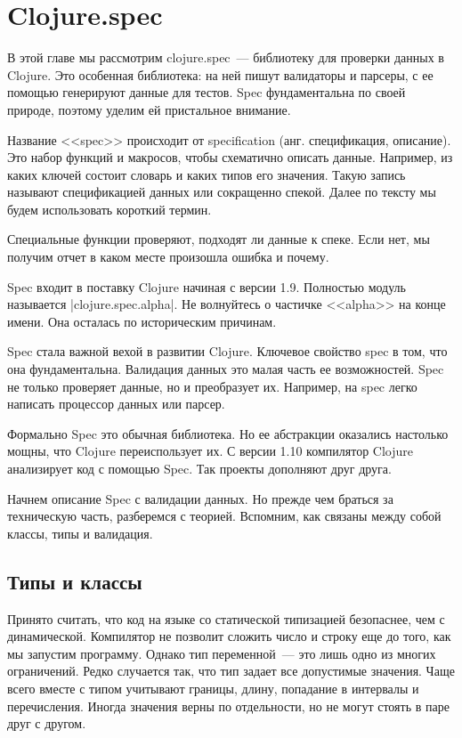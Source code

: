 \chapter{Clojure.spec}

\begin{teaser}
В этой главе мы рассмотрим clojure.spec~--- библиотеку для проверки данных в
Clojure. Это особенная библиотека: на ней пишут валидаторы и парсеры, с ее
помощью генерируют данные для тестов. Spec фундаментальна по своей природе,
поэтому уделим ей пристальное внимание.
\end{teaser}

Название <<spec>> происходит от specification (анг. спецификация, описание). Это
набор функций и макросов, чтобы схематично описать данные. Например, из каких
ключей состоит словарь и каких типов его значения. Такую запись называют
спецификацией данных или сокращенно спекой. Далее по тексту мы будем
использовать короткий термин.

Специальные функции проверяют, подходят ли данные к спеке. Если нет, мы получим
отчет в каком месте произошла ошибка и почему.

Spec входит в поставку Clojure начиная с версии 1.9. Полностью модуль называется
\spverb|clojure.spec.alpha|. Не волнуйтесь о частичке <<alpha>> на конце
имени. Она осталась по историческим причинам.

Spec стала важной вехой в развитии Clojure. Ключевое свойство spec в том, что
она фундаментальна. Валидация данных это малая часть ее возможностей. Spec не
только проверяет данные, но и преобразует их. Например, на spec легко написать
процессор данных или парсер.

Формально Spec это обычная библиотека. Но ее абстракции оказались настолько
мощны, что Clojure переиспользует их. С версии 1.10 компилятор Clojure
анализирует код с помощью Spec. Так проекты дополняют друг друга.

Начнем описание Spec с валидации данных. Но прежде чем браться за техническую
часть, разберемся с теорией. Вспомним, как связаны между собой классы, типы и
валидация.

\section{Типы и классы}

\label{type-and-pred}

Принято считать, что код на языке со статической типизацией безопаснее, чем с
динамической. Компилятор не позволит сложить число и строку еще до того, как мы
запустим программу. Однако тип переменной~--- это лишь одно из многих
ограничений. Редко случается так, что тип задает все допустимые значения. Чаще
всего вместе с типом учитывают границы, длину, попадание в интервалы и
перечисления. Иногда значения верны по отдельности, но не могут стоять в паре
друг с другом.

